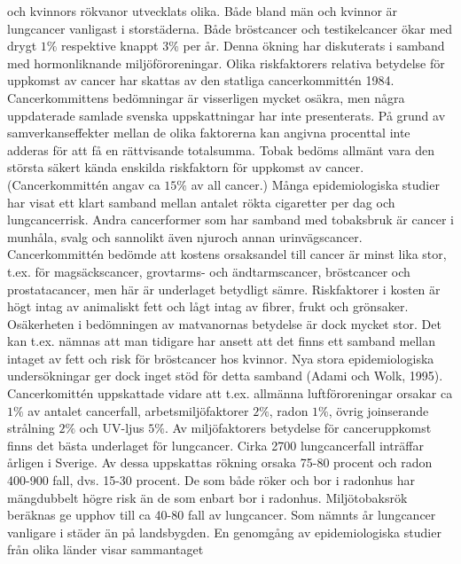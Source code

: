 och kvinnors rökvanor utvecklats olika. Både bland män och kvinnor är lungcancer vanligast i storstäderna.
Både bröstcancer och testikelcancer ökar med drygt \(1 \%\) respektive knappt \(3 \%\) per år. Denna ökning har diskuterats i samband med hormonliknande miljöföroreningar.
Olika riskfaktorers relativa betydelse för uppkomst av cancer har skattas av den statliga cancerkommittén 1984. Cancerkommittens bedömningar är visserligen mycket osäkra, men några uppdaterade samlade svenska uppskattningar har inte presenterats. På grund av samverkanseffekter mellan de olika faktorerna kan angivna procenttal inte adderas för att få en rättvisande totalsumma.
Tobak bedöms allmänt vara den största säkert kända enskilda riskfaktorn för uppkomst av cancer. (Cancerkommittén angav ca \(15 \%\) av all cancer.) Många epidemiologiska studier har visat ett klart samband mellan antalet rökta cigaretter per dag och lungcancerrisk. Andra cancerformer som har samband med tobaksbruk är cancer i munhåla, svalg och sannolikt även njuroch annan urinvägscancer. Cancerkommittén bedömde att kostens orsaksandel till cancer är minst lika stor, t.ex. för magsäckscancer, grovtarms- och ändtarmscancer, bröstcancer och prostatacancer, men här är underlaget betydligt sämre. Riskfaktorer i kosten är högt intag av animaliskt fett och lågt intag av fibrer, frukt och grönsaker. Osäkerheten i bedömningen av matvanornas betydelse är dock mycket stor. Det kan t.ex. nämnas att man tidigare har ansett att det finns ett samband mellan intaget av fett och risk för bröstcancer hos kvinnor. Nya stora epidemiologiska undersökningar ger dock inget stöd för detta samband (Adami och Wolk, 1995).
Cancerkomittén uppskattade vidare att t.ex. allmänna luftföroreningar orsakar ca \(1 \%\) av antalet cancerfall, arbetsmiljöfaktorer \(2 \%\), radon \(1 \%\), övrig joinserande strålning \(2 \%\) och UV-ljus \(5 \%\).
Av miljöfaktorers betydelse för canceruppkomst finns det bästa underlaget för lungcancer. Cirka 2700 lungcancerfall inträffar årligen i Sverige. Av dessa uppskattas rökning orsaka 75-80 procent och radon 400-900 fall, dvs. 15-30 procent. De som både röker och bor i radonhus har mängdubbelt högre risk än de som enbart bor i radonhus. Miljötobaksrök beräknas ge upphov till ca 40-80 fall av lungcancer. Som nämnts år lungcancer vanligare i städer än på landsbygden. En genomgång av epidemiologiska studier från olika länder visar sammantaget

